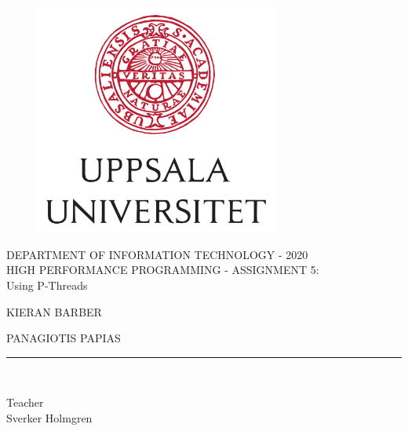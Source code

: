 \begin{titlepage}
  \begin{center}
  \vspace*{-1in}
      \begin{figure}[htb]
          \begin{center}
              \includegraphics[width=8cm]{../images/UU_logo.jpg}
          \end{center}
      \end{figure}

      DEPARTMENT OF INFORMATION TECHNOLOGY - 2020\\
      \vspace*{0.15in}
      HIGH PERFORMANCE PROGRAMMING - ASSIGNMENT 5:\\Using P-Threads\\
      \vspace*{0.3in}
      \begin{large}
          KIERAN BARBER\\
      \end{large}
      \vspace*{0.1in}
      \begin{Large}
          PANAGIOTIS PAPIAS\\
      \end{Large}
      \vspace*{0.1in}
      \rule{80mm}{0.1mm}\\
      \vspace*{0.1in}
      \begin{large}
          Teacher \\
          Sverker Holmgren
      \end{large}
  \end{center}
\end{titlepage}
